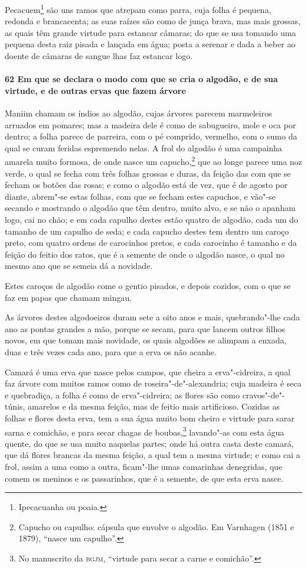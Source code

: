 Pecacuem\footnote{ Ipecacuanha ou poaia.} são uns ramos que atrepam como parra, cuja folha
é pequena, redonda e brancacenta; as suas raízes são como de junça brava, mas mais
grossas, as quais têm grande virtude para estancar câmaras; do que se usa tomando uma
pequena desta raiz pisada e lançada em água; posta a serenar e dada a beber ao doente de
câmaras de sangue lhas faz estancar logo.

\paragraph{62 Em que se declara o modo com que se cria o algodão, e de sua virtude, e de
outras ervas que fazem árvore}

Maniim chamam os índios ao algodão, cujas árvores parecem marmeleiros arruados em pomares;
mas a madeira dele é como de sabugueiro, mole e oca por dentro; a folha parece de
parreira, com o pé comprido, vermelho, com o sumo da qual se curam feridas espremendo
nelas. A frol do algodão é uma campainha amarela muito formosa, de onde nasce um
capucho,\footnote{ Capucho ou capulho: cápsula que envolve o algodão. 
Em Varnhagen (1851 e 1879), ``nasce um capulho''.} que ao longe parece
uma noz verde, o qual se fecha com três folhas grossas e duras, da feição das com que se
fecham os botões das rosas; e como o algodão está de vez, que é de agosto por diante,
abrem"-se estas folhas, com que se fecham estes capuchos, e vão"-se secando e mostrando o
algodão que têm dentro, muito alvo, e se não o apanham logo, cai no chão; e em cada
capulho destes estão quatro de algodão, cada um do tamanho de um capulho de seda; e cada
capucho destes tem dentro um caroço preto, com quatro ordens de carocinhos pretos, e cada
carocinho é tamanho e da feição do feitio dos ratos, que é a semente de onde o algodão
nasce, o qual no mesmo ano que se semeia dá a novidade.

Estes caroços de algodão come o gentio pisados, e depois cozidos, com o que se faz em
papas que chamam mingau.

As árvores destes algodoeiros duram sete a oito anos e mais, quebrando"-lhe cada ano as
pontas grandes a mão, porque se secam, para que lancem outros filhos novos, em que tomam
mais novidade, os quais algodões se alimpam a enxada, duas e três vezes cada ano, para que
a erva os não acanhe.

Camará é uma erva que nasce pelos campos, que cheira a erva"-cidreira, a qual faz árvore
com muitos ramos como de roseira"-de"-alexandria; cuja madeira é seca e quebradiça, a folha
é como de erva"-cidreira; as flores são como cravos"-de"-túnis, amarelos e da mesma feição,
mas de feitio mais artificioso. Cozidas as folhas e flores desta erva, tem a sua água
muito bom cheiro e virtude para sarar sarna e comichão, e para secar chagas de
boubas,\footnote{ No manuscrito da \textsc{bgjm}, ``virtude para secar a carne e
comichão''.} lavando"-as com esta água quente, do que se usa muito naquelas partes; onde há
outra casta deste camará, que dá flores brancas da mesma feição, a qual tem a mesma
virtude; e como cai a frol, assim a uma como a outra, ficam"-lhe umas camarinhas
denegridas, que comem os meninos e os passarinhos, que é a semente, de que esta erva
nasce.

